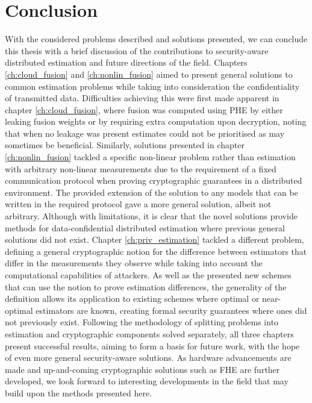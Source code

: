 
\chapter{Conclusion}\label{ch:conclusion}
With the considered problems described and solutions presented, we can conclude this thesis with a brief discussion of the contributions to security-aware distributed estimation and future directions of the field. Chapters \ref{ch:cloud_fusion} and \ref{ch:nonlin_fusion} aimed to present general solutions to common estimation problems while taking into consideration the confidentiality of transmitted data. Difficulties achieving this were first made apparent in chapter \ref{ch:cloud_fusion}, where fusion was computed using PHE by either leaking fusion weights or by requiring extra computation upon decryption, noting that when no leakage was present estimates could not be prioritised as may sometimes be beneficial. Similarly, solutions presented in chapter \ref{ch:nonlin_fusion} tackled a specific non-linear problem rather than estimation with arbitrary non-linear measurements due to the requirement of a fixed communication protocol when proving cryptographic guarantees in a distributed environment. The provided extension of the solution to any models that can be written in the required protocol gave a more general solution, albeit not arbitrary. Although with limitations, it is clear that the novel solutions provide methods for data-confidential distributed estimation where previous general solutions did not exist. Chapter \ref{ch:priv_estimation} tackled a different problem, defining a general cryptographic notion for the difference between estimators that differ in the measurements they observe while taking into account the computational capabilities of attackers. As well as the presented new schemes that can use the notion to prove estimation differences, the generality of the definition allows its application to existing schemes where optimal or near-optimal estimators are known, creating formal security guarantees where ones did not previously exist. Following the methodology of splitting problems into estimation and cryptographic components solved separately, all three chapters present successful results, aiming to form a basis for future work, with the hope of even more general security-aware solutions. As hardware advancements are made and up-and-coming cryptographic solutions such as FHE are further developed, we look forward to interesting developments in the field that may build upon the methods presented here.